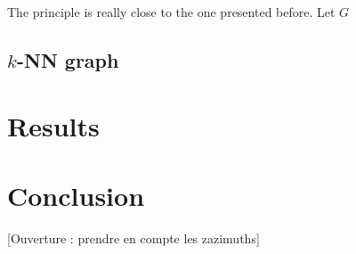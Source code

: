\documentclass[lettersize,journal]{IEEEtran}
\begin{document}
The principle is really close to the one presented before. Let $G$

\subsection{$k$-NN graph}

\section{Results}

\section{Conclusion}

[Ouverture : prendre en compte les zazimuths]

\printglossary[type=\acronymtype]



\end{document}
